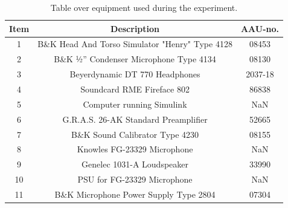 \begin{table}[H]
	\centering
	\begin{tabular}{ c c c } \toprule
		{Item}	& {Description} 						& {AAU-no}. \\ \bottomrule 
		1	&	B\&K Head And Torso Simulator "Henry" Type 4128	& 08453	\\
		2	&	B\&K ½'' Condenser Microphone Type 4134 	& 08130		\\
		3	&	Beyerdynamic DT 770 Headphones				& 2037-18		\\
		4	&	Soundcard RME Fireface 802					& 86838		\\
		5	&	Computer running Simulink								& NaN		\\
		6	&	G.R.A.S. 26-AK Standard Preamplifier		& 52665		\\
		7	&	B\&K Sound Calibrator Type 4230				& 08155		\\ 
		8	&	Knowles FG-23329 Microphone					& NaN		\\
		9	&	Genelec 1031-A Loudspeaker								& 33990		\\ 
		10	&	PSU for FG-23329  Microphone	& NaN\\
		11	& 	B\&K Microphone Power Supply Type 2804		& 07304		\\
		\bottomrule
	\end{tabular}
	\caption{Table over equipment used during the experiment.}
	\label{tab:AngleOfIncideceHP}
\end{table}

